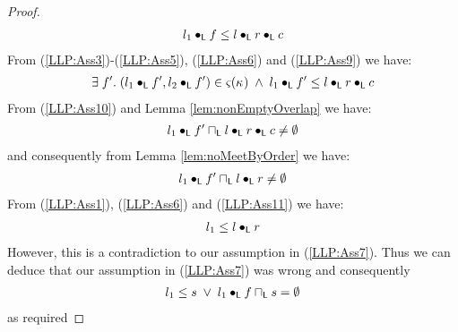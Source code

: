 \begin{lemma}
\begin{proof}
%
\begin{align}
	l_1 \bullet_{\textsf{L}} f \leq l \bullet_{\textsf{L}} r \bullet_{\textsf{L}} c \label{LLP:Ass9}
\end{align}
%
From (\ref{LLP:Ass3})-(\ref{LLP:Ass5}), (\ref{LLP:Ass6}) and (\ref{LLP:Ass9}) we have:
%
\begin{align}
	\exists\; f'.\; (l_1 \bullet_{\textsf{L}} f', l_2 \bullet_{\textsf{L}} f') \in \varsigma_{}(\kappa_{}) \;\land\; l_1 \bullet_{\textsf{L}} f' \leq l \bullet_{\textsf{L}} r \bullet_{\textsf{L}} c \label{LLP:Ass10}
\end{align}
%
From (\ref{LLP:Ass10}) and Lemma \ref{lem:nonEmptyOverlap} we have:
%
\begin{align}
	l_1 \bullet_{\textsf{L}} f' \sqcap_{\textsf{L}} l \bullet_{\textsf{L}} r \bullet_{\textsf{L}} c \not= \emptyset \nonumber
\end{align}
%
and consequently from Lemma \ref{lem:noMeetByOrder} we have:
%
\begin{align}
	l_1 \bullet_{\textsf{L}} f' \sqcap_{\textsf{L}} l \bullet_{\textsf{L}} r \not= \emptyset \label{LLP:Ass11}
\end{align}
%
From (\ref{LLP:Ass1}), (\ref{LLP:Ass6}) and (\ref{LLP:Ass11}) we have:
%
\begin{align}
	l_1 \leq l \bullet_{\textsf{L}} r \nonumber
\end{align}
%
However, this is a contradiction to our assumption in (\ref{LLP:Ass7}). Thus we can deduce that our assumption in (\ref{LLP:Ass7}) was wrong and consequently
%
\begin{align}
	l_1 \leq s \;\lor\; l_1 \bullet_{\textsf{L}} f \sqcap_{\textsf{L}} s = \emptyset \nonumber
\end{align}
%
as required
\end{proof}
\end{lemma}
%
%
